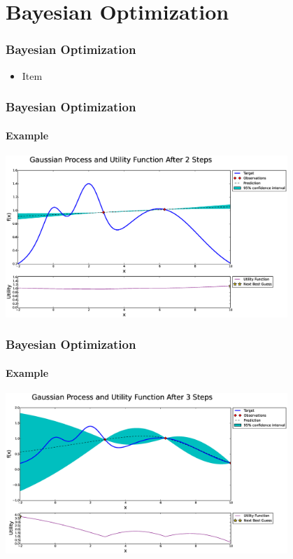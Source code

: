 \section{Bayesian Optimization}

\begin{frame}
\frametitle{Bayesian Optimization}

\begin{itemize}
	\item Item
\end{itemize}
\end{frame}

\begin{frame}
\frametitle{Bayesian Optimization}
\framesubtitle{Example}

\centering
\includegraphics[width=0.8\textwidth]{figures/bayesian-optimization/fig0}

\end{frame}

\begin{frame}
	\frametitle{Bayesian Optimization}
	\framesubtitle{Example}
	
	\centering
	\includegraphics[width=0.8\textwidth]{figures/bayesian-optimization/fig1}
	
\end{frame}

